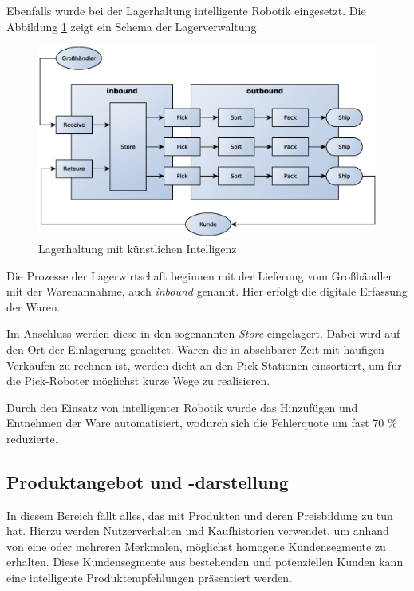 Ebenfalls wurde bei der Lagerhaltung intelligente Robotik eingesetzt. Die Abbildung \ref{img:logistics_schema_in_e__commerce} zeigt ein Schema der Lagerverwaltung.

\begin{figure}[!ht]
	\centering
	\includegraphics[width=\linewidth]{images/logistics-ecommerce.eps}
	\caption{Lagerhaltung mit künstlichen Intelligenz}
	\label{img:logistics_schema_in_e__commerce}
\end{figure}

Die Prozesse der Lagerwirtschaft beginnen mit der Lieferung vom Großhändler mit der Warenannahme, auch \textit{inbound} genannt. Hier erfolgt die digitale Erfassung der Waren.\vspace{0.2cm}

Im Anschluss werden diese in den sogenannten \textit{Store} eingelagert. Dabei wird auf den Ort der Einlagerung geachtet. Waren die in absehbarer Zeit mit häufigen Verkäufen zu rechnen ist, werden dicht an den Pick-Stationen einsortiert, um für die Pick-Roboter möglichst kurze Wege zu realisieren.\vspace{0.2cm}



Durch den Einsatz von intelligenter Robotik wurde das Hinzufügen und Entnehmen der Ware automatisiert, wodurch sich die Fehlerquote um fast 70 \% reduzierte.

\subsection{Produktangebot und -darstellung}
In diesem Bereich fällt alles, das mit Produkten und deren Preisbildung zu tun hat. Hierzu werden Nutzerverhalten und Kaufhistorien verwendet, um anhand von eine oder mehreren Merkmalen, möglichst homogene Kundensegmente zu erhalten. Diese Kundensegmente aus bestehenden und potenziellen Kunden kann eine intelligente Produktempfehlungen präsentiert werden.

